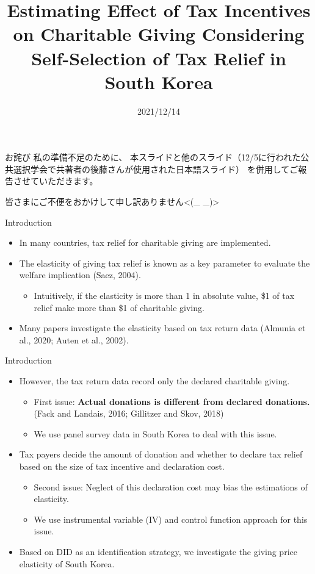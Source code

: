 \documentclass[
  ignorenonframetext,
  aspectratio=169,
]{beamer}
\title{Estimating Effect of Tax Incentives on Charitable Giving Considering Self-Selection of Tax Relief in South Korea  }
\author[shortname]{ Hiroki Kato \inst{1} \and  Tsuyoshi Goto \inst{2} \and  Yong-Rok Kim \inst{3} \and }
\institute[shortinst]{ \inst{1} Osaka University \and  \inst{2} Chiba University \and  \inst{3} Kansai University \and }
\date{2021/12/14}
\providecommand{\tightlist}{%
  \setlength{\itemsep}{0pt}\setlength{\parskip}{0pt}}
\begin{document}
\frame{\titlepage}

\begin{frame}{お詫び}
\protect\hypertarget{ux304aux8a6bux3073}{}
私の準備不足のために、
本スライドと他のスライド（12/5に行われた公共選択学会で共著者の後藤さんが使用された日本語スライド）
を併用してご報告させていただきます。

皆さまにご不便をおかけして申し訳ありません\textless(\_ \_)\textgreater{}
\end{frame}

\begin{frame}{Introduction}
\protect\hypertarget{introduction}{}
\begin{itemize}
\tightlist
\item
  In many countries, tax relief for charitable giving are implemented.
\item
  The elasticity of giving tax relief is known as a key parameter to evaluate the welfare implication (Saez, 2004).

  \begin{itemize}
  \tightlist
  \item
    Intuitively, if the elasticity is more than 1 in absolute value, \$1 of tax relief make more than \$1 of charitable giving.
  \end{itemize}
\item
  Many papers investigate the elasticity based on tax return data (Almunia et al., 2020; Auten et al., 2002).
\end{itemize}
\end{frame}

\begin{frame}{Introduction}
\protect\hypertarget{introduction-1}{}
\begin{itemize}
\tightlist
\item
  However, the tax return data record only the declared charitable giving.

  \begin{itemize}
  \tightlist
  \item
    First issue: \textbf{Actual donations is different from declared donations.} (Fack and Landais, 2016; Gillitzer and Skov, 2018)
  \item
    We use panel survey data in South Korea to deal with this issue.
  \end{itemize}
\item
  Tax payers decide the amount of donation and whether to declare tax relief based on the size of tax incentive and declaration cost.

  \begin{itemize}
  \tightlist
  \item
    Second issue: Neglect of this declaration cost may bias the estimations of elasticity.
  \item
    We use instrumental variable (IV) and control function approach for this issue.
  \end{itemize}
\item
  Based on DID as an identification strategy, we investigate the giving price elasticity of South Korea.
\end{itemize}
\end{frame}
\end{document}
